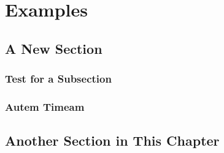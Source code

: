 
\chapter{Examples} %

\label{ch:examples} %


\lipsum[1]


\section{A New Section}

\lipsum[2]



\subsection{Test for a Subsection}

\lipsum[3-5]


\subsection{Autem Timeam}

\lipsum[6]


\section{Another Section in This Chapter}

\lipsum[7]
